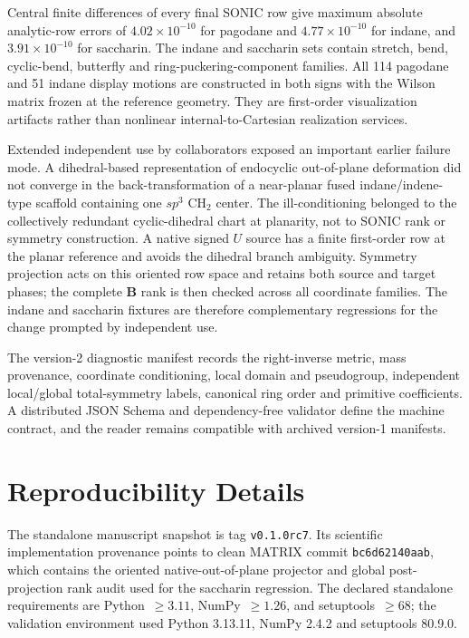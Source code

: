 \documentclass[10pt]{article}
\newcommand{\Bmat}{\mathbf{B}}
\begin{document}
Central finite differences of every final SONIC row give maximum absolute
analytic-row errors of \(4.02\times10^{-10}\) for pagodane and
\(4.77\times10^{-10}\) for indane, and \(3.91\times10^{-10}\) for saccharin.
The indane and saccharin sets contain stretch, bend,
cyclic-bend, butterfly and ring-puckering-component families.  All 114 pagodane
and 51 indane display motions are constructed in both signs with the Wilson
matrix frozen at the reference geometry.  They are first-order visualization
artifacts rather than nonlinear internal-to-Cartesian realization services.

Extended independent use by collaborators exposed an important earlier
failure mode.  A dihedral-based representation of endocyclic out-of-plane
deformation did not converge in the back-transformation of a near-planar fused
indane/indene-type scaffold containing one \(sp^3\) CH\(_2\) center.  The
ill-conditioning belonged to the collectively redundant cyclic-dihedral chart
at planarity, not to SONIC rank or symmetry construction.  A native signed
\(U\) source has a finite first-order row at the planar reference and avoids
the dihedral branch ambiguity.  Symmetry projection acts on this oriented
row space and retains both source and target phases; the complete \(\Bmat\)
rank is then checked across all coordinate families.  The indane and
saccharin fixtures are therefore complementary regressions for the change
prompted by independent use.

The version-2 diagnostic manifest records the right-inverse metric, mass
provenance, coordinate conditioning, local domain and pseudogroup, independent
local/global total-symmetry labels, canonical ring order and primitive
coefficients.  A distributed JSON Schema and dependency-free validator define
the machine contract, and the reader remains compatible with archived
version-1 manifests.

\section{Reproducibility Details}

The standalone manuscript snapshot is tag \texttt{v0.1.0rc7}.  Its scientific
implementation provenance points to clean MATRIX commit
\texttt{bc6d62140aab}, which contains the oriented native-out-of-plane
projector and global post-projection rank audit used for the saccharin
regression.  The declared standalone
requirements are Python~\(\geq3.11\), NumPy~\(\geq1.26\), and
setuptools~\(\geq68\); the validation environment used Python 3.13.11, NumPy
2.4.2 and setuptools 80.9.0.
\end{document}
